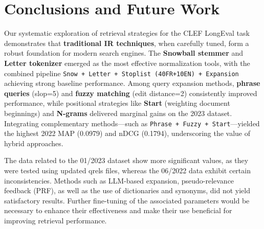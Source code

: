 \section{Conclusions and Future Work}
\label{sec:conclusion}

Our systematic exploration of retrieval strategies for the CLEF LongEval task demonstrates that \textbf{traditional IR techniques}, when carefully tuned, form a robust foundation for modern search engines. The \textbf{Snowball stemmer} and \textbf{Letter tokenizer} emerged as the most effective normalization tools, with the combined pipeline \texttt{Snow + Letter + Stoplist (40FR+10EN) + Expansion} achieving strong baseline performance. Among query expansion methods, \textbf{phrase queries} (slop=5) and \textbf{fuzzy matching} (edit distance=2) consistently improved performance, while positional strategies like \textbf{Start} (weighting document beginnings) and \textbf{N-grams} delivered marginal gains on the 2023 dataset. Integrating complementary methods---such as \texttt{Phrase + Fuzzy + Start}---yielded the highest 2022 MAP (0.0979) and nDCG (0.1794), underscoring the value of hybrid approaches.
\vspace{1\baselineskip}

The data related to the 01/2023 dataset show more significant values, as they were tested using updated qrels files, whereas the 06/2022 data exhibit certain inconsistencies.
Methods such as LLM-based expansion, pseudo-relevance feedback (PRF), as well as the use of dictionaries and synonyms, did not yield satisfactory results. Further fine-tuning of the associated parameters would be necessary to enhance their effectiveness and make their use beneficial for improving retrieval performance.
